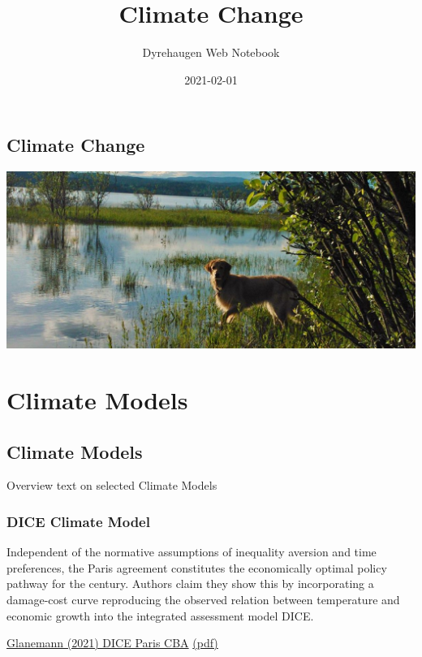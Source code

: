 \documentclass[
]{book}
\title{Climate Change}
\author{Dyrehaugen Web Notebook}
\date{2021-02-01}
\begin{document}
\maketitle

{
\setcounter{tocdepth}{1}
\tableofcontents
}
\hypertarget{climate-change}{%
\chapter{Climate Change}\label{climate-change}}

\includegraphics{fig/zelda.jpg}

\hypertarget{part-climate-models}{%
\part{Climate Models}\label{part-climate-models}}

\hypertarget{climate-models}{%
\chapter{Climate Models}\label{climate-models}}

Overview text on selected Climate Models

\hypertarget{dice-climate-model}{%
\section{DICE Climate Model}\label{dice-climate-model}}

Independent of the
normative assumptions of inequality aversion and time preferences,
the Paris agreement constitutes the economically optimal policy pathway
for the century.
Authors claim they show this by incorporating a
damage-cost curve reproducing
the observed relation between temperature
and economic growth into the integrated assessment model DICE.

\href{https://www.nature.com/articles/s41467-019-13961-1}{Glanemann (2021) DICE Paris CBA}
\href{pdf/Glanemann_2021_DICE_Paris_CBA.pdf}{(pdf)}
\end{document}
